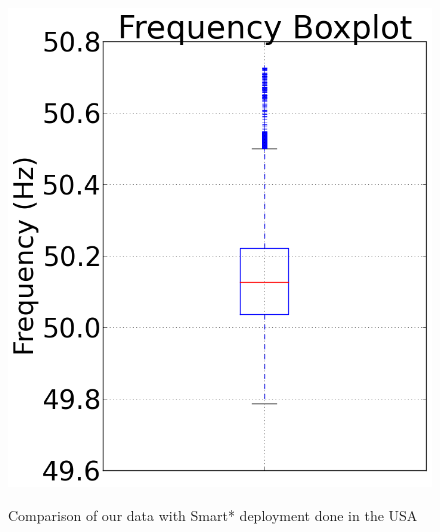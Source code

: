 \documentclass[10pt]{sensys-proc}
\begin{document}
\begin{figure}[t!]
{    \includegraphics[scale=0.125]{./figures/frequency_box.png}}
    \hspace{1mm}
    \vspace{-3mm}
   	\caption{Comparison of our data with Smart* deployment done in the USA}
    \label{fig:unreliable}
\end{figure}
\end{document}
